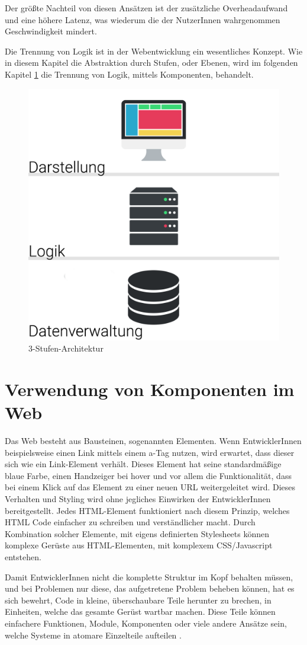 Der größte Nachteil von diesen Ansätzen ist der zusätzliche Overheadaufwand und eine höhere Latenz, was wiederum die der NutzerInnen wahrgenommen Geschwindigkeit mindert.

Die Trennung von Logik ist in der Webentwicklung ein wesentliches Konzept. Wie in diesem Kapitel die Abstraktion durch Stufen, oder Ebenen, wird im folgenden Kapitel \ref{cha:component_usage} die Trennung von Logik, mittels Komponenten, behandelt.

\begin{figure}
	\centering
	\includegraphics[width=0.5\linewidth]{images/3-stufen-architektur}
	\caption{3-Stufen-Architektur}
	\label{fig:3-stufen-architektur}
\end{figure}

\section{Verwendung von Komponenten im Web}
\label{cha:component_usage}
Das Web besteht aus Bausteinen, sogenannten Elementen. Wenn EntwicklerInnen beispielsweise einen Link mittels einem a-Tag nutzen, wird erwartet, dass dieser sich wie ein Link-Element verhält. Dieses Element hat seine standardmäßige blaue Farbe, einen Handzeiger bei hover und vor allem die Funktionalität, dass bei einem Klick auf das Element zu einer neuen URL weitergeleitet wird. Dieses Verhalten und Styling wird ohne jegliches Einwirken der EntwicklerInnen bereitgestellt. Jedes HTML-Element funktioniert nach diesem Prinzip, welches HTML Code einfacher zu schreiben und verständlicher macht.
Durch Kombination solcher Elemente, mit eigens definierten Stylesheets können komplexe Gerüste aus HTML-Elementen, mit komplexem CSS/Javascript entstehen.

Damit EntwicklerInnen nicht die komplette Struktur im Kopf behalten müssen, und bei Problemen nur diese, das aufgetretene Problem beheben können, hat es sich bewehrt, Code in kleine, überschaubare Teile herunter zu brechen, in Einheiten, welche das gesamte Gerüst wartbar machen. Diese Teile können einfachere Funktionen, Module, Komponenten oder viele andere Ansätze sein, welche Systeme in atomare Einzelteile aufteilen \cite{components-benefit}.

